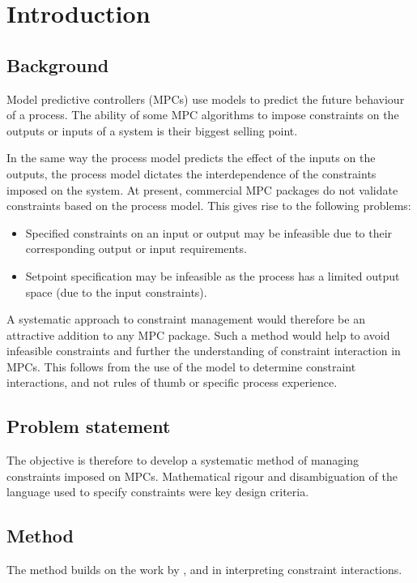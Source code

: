 \chapter{Introduction}\label{chap:intro}
\section{Background}
Model predictive controllers (MPCs) use models to predict the future behaviour of a process.
The ability of some MPC algorithms to impose constraints on the outputs or inputs of a system is their biggest selling point.

In the same way the process model predicts the effect of the inputs on the outputs, the process model dictates the interdependence of the constraints imposed on the system.
At present, commercial MPC packages do not validate constraints based on the process model.
This gives rise to the following problems:
\begin{itemize}
  \item Specified constraints on an input or output may be infeasible due to their corresponding output or input requirements.
  \item Setpoint specification may be infeasible as the process has a limited output space (due to the input constraints).
\end{itemize}

A systematic approach to constraint management would therefore be an attractive addition to any MPC package. 
Such a method would help to avoid infeasible constraints and further the understanding of constraint interaction in MPCs.
This follows from the use of the model to determine constraint interactions, and not rules of thumb or specific process experience.

\section{Problem statement}
The objective is therefore to develop a systematic method of managing constraints imposed on MPCs.
Mathematical rigour and disambiguation of the language used to specify constraints were key design criteria.

\section{Method}
The method builds on the work by \citet{vinsonphd}, \citet{limaphd} and \citet{opconproc} in interpreting constraint interactions.

